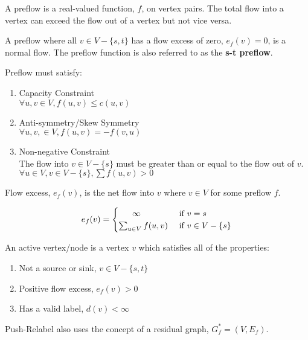 \begin{definition}[Preflow]
	A preflow is a real-valued function, $f$, on vertex pairs. The total flow into a vertex can exceed the flow out of a vertex but not vice versa.
	
	A preflow where all $v \in V-\{s, t\}$ has a flow excess of zero, $e_f(v) = 0$, is a normal flow. The preflow function is also referred to as the \textbf{s-t preflow}.
	
	Preflow must satisfy:
	\begin{enumerate}
		\item Capacity Constraint\\
		$\forall u,v \in V, f(u,v) \leq c(u,v)$
		
		\item Anti-symmetry/Skew Symmetry\\
		$\forall u, v, \in V, f(u,v) = -f(v,u)$
		
		\item Non-negative Constraint\\
		The flow into $v \in V-\{s\}$ must be greater than or equal to the flow out of $v$. $\forall u \in V, v \in V-\{s\}, \sum f(u,v)>0$
	\end{enumerate}
\end{definition}

\begin{definition}
	Flow excess, $e_f(v)$, is the net flow into $v$ where $v \in V$ for some preflow $f$.
	
	\[
	e_f(v) =
	\begin{cases} 
	\hfill \infty \hfill & \text{ if $v=s$} \\
	\hfill \sum_{u \in V}f(u,v) \hfill & \text{ if $v \in V-\{s\}$} \\
	\end{cases}
	\]
\end{definition}

\begin{definition}
	An active vertex/node is a vertex $v$ which satisfies all of the properties:
	\begin{enumerate}
		\item Not a source or sink, $v \in V-\{s,t\}$
		\item Positive flow excess, $e_f(v) > 0$
		\item Has a valid label, $d(v) < \infty$
	\end{enumerate}
\end{definition}

Push-Relabel also uses the concept of a residual graph, $G^*_f=(V, E_f)$.

